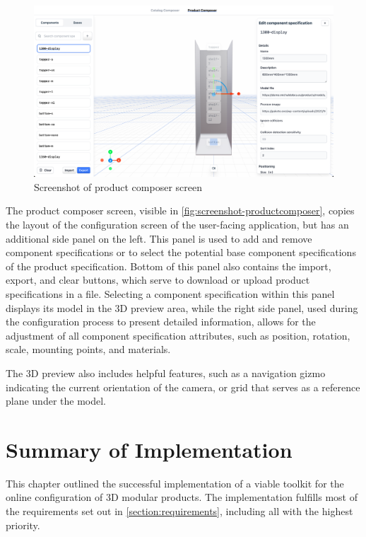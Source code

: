 \begin{figure}[h!]
\centering
\includegraphics[width=\textwidth]{images/screenshot_productcomposer.png}
\caption{Screenshot of product composer screen}
\label{fig:screenshot-productcomposer}
\end{figure}

The product composer screen, visible in \autoref{fig:screenshot-productcomposer}, copies the layout of the configuration screen of the user-facing application, but has an additional side panel on the left. This panel is used to add and remove component specifications or to select the potential base component specifications of the product specification. Bottom of this panel also contains the import, export, and clear buttons, which serve to download or upload product specifications in a  file. Selecting a component specification within this panel displays its model in the 3D preview area, while the right side panel, used during the configuration process to present detailed information, allows for the adjustment of all component specification attributes, such as position, rotation, scale, mounting points, and materials.

The 3D preview also includes helpful features, such as a navigation gizmo indicating the current orientation of the camera, or grid that serves as a reference plane under the model.


\section{Summary of Implementation} \label{section:requirmenets-evaulation}

This chapter outlined the successful implementation of a viable toolkit for the online configuration of 3D modular products. The implementation fulfills most of the requirements set out in \autoref{section:requirements}, including all with the highest priority.

